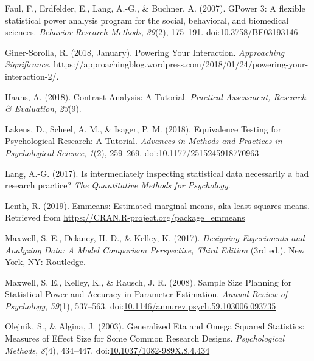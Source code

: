 \documentclass[
  ,jou,floatsintext]{apa6}
\begin{document}
\leavevmode\hypertarget{ref-faul_gpower_2007}{}%
Faul, F., Erdfelder, E., Lang, A.-G., \& Buchner, A. (2007). GPower 3: A flexible statistical power analysis program for the social, behavioral, and biomedical sciences. \emph{Behavior Research Methods}, \emph{39}(2), 175--191. doi:\href{https://doi.org/10.3758/BF03193146}{10.3758/BF03193146}

\leavevmode\hypertarget{ref-giner-sorolla_powering_2018}{}%
Giner-Sorolla, R. (2018, January). Powering Your Interaction. \emph{Approaching Significance}. https://approachingblog.wordpress.com/2018/01/24/powering-your-interaction-2/.

\leavevmode\hypertarget{ref-haans_contrast_2018}{}%
Haans, A. (2018). Contrast Analysis: A Tutorial. \emph{Practical Assessment, Research \& Evaluation}, \emph{23}(9).

\leavevmode\hypertarget{ref-lakens_equivalence_2018}{}%
Lakens, D., Scheel, A. M., \& Isager, P. M. (2018). Equivalence Testing for Psychological Research: A Tutorial. \emph{Advances in Methods and Practices in Psychological Science}, \emph{1}(2), 259--269. doi:\href{https://doi.org/10.1177/2515245918770963}{10.1177/2515245918770963}

\leavevmode\hypertarget{ref-lang2017intermediately}{}%
Lang, A.-G. (2017). Is intermediately inspecting statistical data necessarily a bad research practice? \emph{The Quantitative Methods for Psychology}.

\leavevmode\hypertarget{ref-lenthemmeans}{}%
Lenth, R. (2019). Emmeans: Estimated marginal means, aka least-squares means. Retrieved from \url{https://CRAN.R-project.org/package=emmeans}

\leavevmode\hypertarget{ref-maxwell_designing_2017}{}%
Maxwell, S. E., Delaney, H. D., \& Kelley, K. (2017). \emph{Designing Experiments and Analyzing Data: A Model Comparison Perspective, Third Edition} (3rd ed.). New York, NY: Routledge.

\leavevmode\hypertarget{ref-maxwell_sample_2008}{}%
Maxwell, S. E., Kelley, K., \& Rausch, J. R. (2008). Sample Size Planning for Statistical Power and Accuracy in Parameter Estimation. \emph{Annual Review of Psychology}, \emph{59}(1), 537--563. doi:\href{https://doi.org/10.1146/annurev.psych.59.103006.093735}{10.1146/annurev.psych.59.103006.093735}

\leavevmode\hypertarget{ref-olejnik_generalized_2003}{}%
Olejnik, S., \& Algina, J. (2003). Generalized Eta and Omega Squared Statistics: Measures of Effect Size for Some Common Research Designs. \emph{Psychological Methods}, \emph{8}(4), 434--447. doi:\href{https://doi.org/10.1037/1082-989X.8.4.434}{10.1037/1082-989X.8.4.434}
\end{document}
